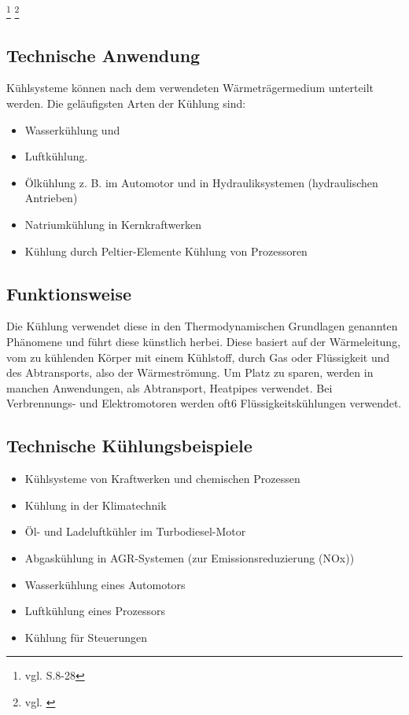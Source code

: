 \footnote{vgl. \cite{Kuehlung1} S.8-28}
\footnote{vgl. \cite{Kuehlung2}}

\newpage

\subsection{Technische Anwendung}

Kühlsysteme können nach dem verwendeten Wärmeträgermedium unterteilt werden. Die geläufigsten Arten der Kühlung sind:

\begin{itemize}
	\item Wasserkühlung und
	\item Luftkühlung.
	\item Ölkühlung z.  B. im Automotor und in Hydrauliksystemen (hydraulischen Antrieben) 
	\item Natriumkühlung in Kernkraftwerken
	\item Kühlung durch Peltier-Elemente Kühlung von Prozessoren
\end{itemize}

\subsection{Funktionsweise}

Die Kühlung verwendet diese in den Thermodynamischen Grundlagen genannten Phänomene und führt diese künstlich herbei. Diese basiert auf der Wärmeleitung, vom zu kühlenden Körper mit einem Kühlstoff, durch Gas oder Flüssigkeit und des Abtransports, also der Wärmeströmung. Um Platz zu sparen, werden in manchen Anwendungen, als Abtransport, Heatpipes verwendet. Bei Verbrennungs- und Elektromotoren werden oft6 Flüssigkeitskühlungen verwendet.



\subsection{Technische Kühlungsbeispiele}

\begin{itemize}
	\item Kühlsysteme von Kraftwerken und chemischen Prozessen
	\item Kühlung in der Klimatechnik
	\item Öl- und Ladeluftkühler im Turbodiesel-Motor
	\item Abgaskühlung in AGR-Systemen (zur Emissionsreduzierung (NOx))
	\item Wasserkühlung eines Automotors
	\item Luftkühlung eines Prozessors
	\item Kühlung für Steuerungen
\end{itemize}


